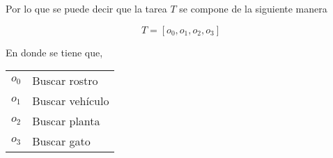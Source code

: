 Por lo que se puede decir que la tarea $T$ se compone de la siguiente manera

\begin{equation} \label{eq-tareas-nodos}%
  T = [o_{0}, o_{1}, o_{2}, o_{3}]
\end{equation}

En donde se tiene que,

\begin{tabular}{l   l}
$o_{0}$ & Buscar rostro \\
$o_{1}$ & Buscar vehículo \\
$o_{2}$ & Buscar planta \\
$o_{3}$ & Buscar gato\\
\end{tabular}
